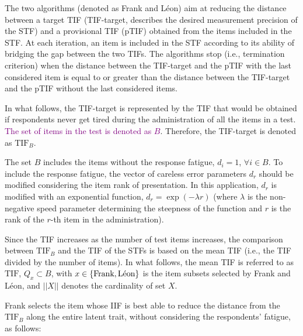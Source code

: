 \documentclass{svproc}
\newcommand{\ottavia}[1]{\textcolor{purple}{#1}}
\begin{document}
The two algorithms (denoted as Frank and Léon) aim at reducing the distance between a target TIF (TIF-target, describes the desired measurement precision of the STF) and a provisional TIF (pTIF) obtained from the items included in the STF. 
At each iteration, an item is included in the STF according to its ability of bridging the gap between the two TIFs. 
The algorithms stop (i.e., termination criterion) when the distance between the TIF-target and the pTIF with the last considered item is equal to or greater than the distance between the TIF-target and the pTIF without the last considered items. 

In what follows, the TIF-target is represented by the TIF that would be obtained if respondents never get tired during the administration of all the items in a test. \ottavia{The set of items in the test is denoted as $B$}. Therefore, the TIF-target is denoted as  $\text{TIF}_B$.

The set $B$ includes the items without the response fatigue, $d_i = 1$, $\forall i \in B$. To include the response fatigue, the vector of careless error parameters $d_r$ should be modified considering the item rank of presentation. In this application, $d_r$ is modified with an exponential function, $d_r = \exp(-\lambda r)$ (where $\lambda$ is the non-negative speed parameter determining the steepness of the function and $r$ is the rank of the $r$-th item in the administration). 


Since the TIF increases as the number of test items increases, the comparison between $\text{TIF}_B$ and the TIF of the STFs is based on the mean TIF (i.e., the TIF divided by the number of items). 
In what follows, the mean TIF  is referred to as $\text{TIF}$, $Q_x \subset B$, with $x \in \{\text{Frank}, \text{\text{Léon}}\}$ is the item subsets selected by Frank and Léon, and $||X||$ denotes the cardinality of set $X$.




Frank selects the item whose IIF is best able to reduce the distance from the $\text{TIF}_B$ along the entire latent trait, without considering the respondents' fatigue, as follows:
\end{document}

